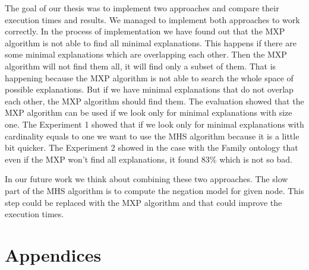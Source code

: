 \documentclass[12pt,a4paper]{article}
\begin{document}
The goal of our thesis was to implement two approaches and compare their execution times and results. We managed to implement both approaches to work correctly. In the process of implementation we have found out that the MXP algorithm is not able to find all minimal explanations. This happens if there are some minimal explanations which are overlapping each other. Then the MXP algorithm will not find them all, it will find only a subset of them. That is happening because the MXP algorithm is not able to search the whole space of possible explanations. But if we have minimal explanations that do not overlap each other, the MXP algorithm should find them. The evaluation showed that the MXP algorithm can be used if we look only for minimal explanations with size one. The Experiment 1 showed that if we look only for minimal explanations with cardinality equals to one we want to use the MHS algorithm because it is a little bit quicker. The Experiment 2 showed in the case with the Family ontology that even if the MXP won't find all explanations, it found 83\% which is not so bad. 

In our future work we think about combining these two approaches. The slow part of the MHS algorithm is to compute the negation model for given node. This step could be replaced with the MXP algorithm and that could improve the execution times.

\pagebreak
{}



\pagebreak
\section*{Appendices}
\end{document}

